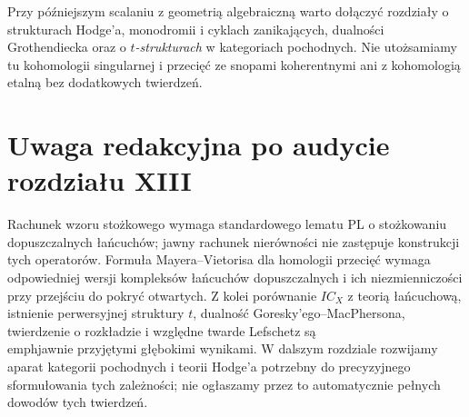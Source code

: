 Przy późniejszym scalaniu z geometrią algebraiczną
warto dołączyć rozdziały o strukturach Hodge'a,
monodromii i cyklach zanikających, dualności
Grothendiecka oraz o \emph{$t$-strukturach} w kategoriach
pochodnych. Nie utożsamiamy tu kohomologii
singularnej i przecięć ze snopami koherentnymi
ani z kohomologią etalną bez dodatkowych twierdzeń.



\section{Uwaga redakcyjna po audycie rozdziału XIII}
\label{sec:xiii-status-po-audycie}
\begin{uwaga}
Rachunek wzoru stożkowego wymaga standardowego lematu
PL o stożkowaniu dopuszczalnych łańcuchów; jawny
rachunek nierówności nie zastępuje konstrukcji
tych operatorów. Formuła Mayera--Vietorisa dla
homologii przecięć wymaga odpowiedniej wersji
kompleksów łańcuchów dopuszczalnych i ich
niezmienniczości przy przejściu do pokryć otwartych.
Z kolei porównanie $IC_X$ z teorią łańcuchową,
istnienie perwersyjnej struktury $t$, dualność
Goresky'ego--MacPhersona, twierdzenie o rozkładzie
i względne twarde Lefschetz są \\emph{jawnie
przyjętymi} głębokimi wynikami. W dalszym
rozdziale rozwijamy aparat kategorii pochodnych
i teorii Hodge'a potrzebny do precyzyjnego
sformułowania tych zależności; nie ogłaszamy
przez to automatycznie pełnych dowodów tych twierdzeń.
\end{uwaga}
